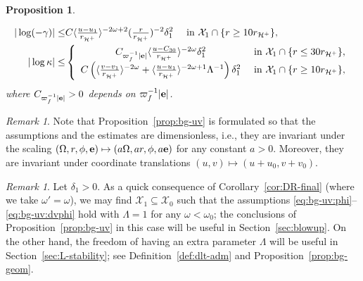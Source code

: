 \documentclass[10pt, reqno]{amsart}
\newtheorem{proposition}[theorem]{Proposition}
\theoremstyle{definition}
\theoremstyle{remark}
\newtheorem{remark}[theorem]{Remark}
\theoremstyle{conjecture}
\numberwithin{equation}{section}
\newcommand{\abs}[1]{\vert#1\vert}
\newcommand{\brk}[1]{\langle#1\rangle}
\newcommand{\set}[1]{\{#1\}}
\newcommand{\0}{\emptyset}
\newcommand{\gmm}{\gamma}
\newcommand{\dlt}{\delta}
\newcommand{\kpp}{\kappa}
\newcommand{\Lmb}{\Lambda}
\newcommand{\omg}{\omega}
\newcommand{\Omg}{\Omega}
\newcommand{\bfe}{{\bf e}}
\newcommand{\calH}{\mathcal H}
\newcommand{\calX}{\mathcal X}
\newcommand{\EH}{\calH^{+}}
\newcommand{\e}{\bfe}							%
\begin{document}
\begin{proposition}
\begin{enumerate}
\begin{align} 
	\abs{\log (-\gmm)} \leq & C \brk{\tfrac{u - u_{1}}{r_{\EH}}}^{-2 \omg + 2} (\tfrac{r}{r_{\EH}} )^{-2} \dlt_{1}^{2} \quad \hbox{ in } \calX_{1} \cap \set{r \geq 10 r_{\EH}},	\label{eq:bg-uv:gmm-decay} \\
	\abs{\log \kpp} \leq & \left\{
	\begin{array}{cl}
	C_{\varpi_{f}^{-1} \abs{\e}} \brk{\tfrac{u - C_{30}}{r_{\EH}}}^{-2 \omg} \dlt_{1}^{2} & \hbox{ in } \calX_{1} \cap \set{r \leq 30 r_{\EH}}	, \\
	C \left( \brk{\tfrac{v - v_{1}}{r_{\EH}}}^{-2 \omg} + \brk{\tfrac{u - u_{1}}{r_{\EH}}}^{-2 \omg + 1} \Lmb^{-1} \right) \dlt_{1}^{2} & \hbox{ in } \calX_{1} \cap \set{r \geq 10 r_{\EH}}	,
	\end{array}\right. 	\label{eq:bg-uv:kpp-decay} 
\end{align}
where $C_{\varpi_{f}^{-1} \abs{\e}} > 0$ depends on $\varpi_{f}^{-1} \abs{\e}$.
\end{enumerate}
\end{proposition}

\begin{remark} \label{rem:bg-uv-dim0}
Note that Proposition~\ref{prop:bg-uv} is formulated so that the assumptions and the estimates are dimensionless, i.e., they are invariant under the scaling $(\Omg, r, \phi, \e) \mapsto (a \Omg, a r, \phi, a \e)$ for any constant $a > 0$. Moreover, they are invariant under coordinate translations $(u, v) \mapsto (u+u_{0}, v + v_{0})$.
\end{remark}
\begin{remark} 
Let $\dlt_{1} > 0$. As a quick consequence of Corollary~\ref{cor:DR-final} (where we take $\omg' = \omg$), we may find $\calX_{1} \subseteq \calX_{0}$ such that the assumptions \eqref{eq:bg-uv:phi}--\eqref{eq:bg-uv:dvphi} hold with $\Lmb = 1$ for any $\omg < \omg_{0}$; the conclusions of Proposition~\ref{prop:bg-uv} in this case will be useful in Section~\ref{sec:blowup}. On the other hand, the freedom of having an extra parameter $\Lmb$ will be useful in Section~\ref{sec:L-stability}; see Definition~\ref{def:dlt-adm} and Proposition~\ref{prop:bg-geom}.
\end{remark}
\end{document}
